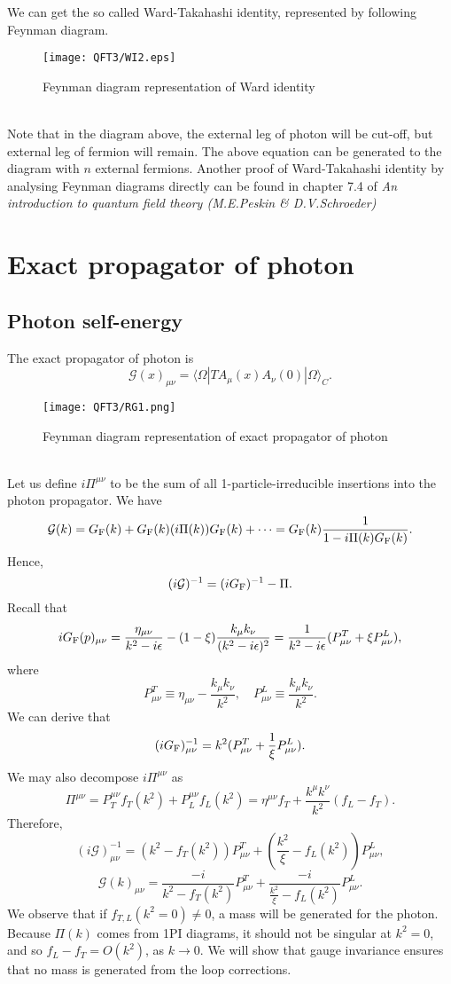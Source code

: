 We can get the so called Ward-Takahashi identity, represented by following Feynman diagram.
\begin{figure}[!h]
\centering
\texttt{[image: QFT3/WI2.eps]}
\caption{Feynman diagram representation of Ward identity}
\end{figure}
\\
Note that in the diagram above, the external leg of photon will be cut-off, but external leg of fermion will remain.
The above equation can be generated to the diagram with $n$ external fermions. 
Another proof of Ward-Takahashi identity by analysing Feynman diagrams directly can be found in chapter 7.4 of \emph{An introduction to quantum field theory (M.E.Peskin \& D.V.Schroeder)}

\section{Exact propagator of photon}
\subsection{Photon self-energy}
\noindent
The exact propagator of photon is
\[\mathcal{G}(x)_{\mu\nu} = \langle  \Omega | T A_{\mu}(x)A_{\nu}(0)| \Omega \rangle_C.\]
\begin{figure}[!htb]
\centering
\texttt{[image: QFT3/RG1.png]}
\caption{Feynman diagram representation of exact propagator of photon}
\end{figure}
\\
Let us define $i\Pi^{\mu\nu}$ to be the sum of all 1-particle-irreducible insertions into the photon propagator.
We have
\[\mathcal{G}(k) = G_{\rm F}(k) + G_{\rm F}(k)(i\Pi(k))G_{\rm F}(k) + \cdots = G_{\rm F}(k) \frac{1}{1-i\Pi(k)G_{\rm F}(k)}.\]
Hence,
\[(i\mathcal{G})^{-1} = (iG_{\rm F})^{-1} - \Pi.\]
Recall that
\[iG_{\rm F}(p)_{\mu\nu}  = \frac{\eta_{\mu\nu}}{k^2-i\epsilon} - (1-\xi)\frac{k_{\mu}k_{\nu}}{(k^2-i\epsilon)^2} = \frac{1}{k^2-i\epsilon}(P^T_{\mu\nu} + \xi P^L_{\mu\nu}),\]
where 
\[P^T_{\mu\nu} \equiv \eta_{\mu\nu} - \frac{k_{\mu}k_{\nu}}{k^2} , \quad  P^L_{\mu\nu} \equiv \frac{k_{\mu}k_{\nu}}{k^2}.\]
We can derive that
\[(iG_{\rm F})^{-1}_{\mu\nu} = k^2 (P^T_{\mu\nu} + \frac{1}{\xi} P^L_{\mu\nu}).\]
We may also decompose $i\Pi^{\mu\nu}$ as
\[\Pi^{\mu\nu} = P_T^{\mu\nu}f_T(k^2) +  P_L^{\mu\nu}f_L(k^2) = \eta^{\mu\nu}f_T + \frac{k^{\mu}k^{\nu}}{k^2}(f_L-f_T).\]
Therefore,
\[(i\mathcal{G})^{-1}_{\mu\nu} = (k^2-f_T(k^2))P^T_{\mu\nu} + (\frac{k^2}{\xi}-f_L(k^2)) P^L_{\mu\nu},\]
\[\mathcal{G}(k)_{\mu\nu} = \frac{-i}{k^2-f_T(k^2)}P^T_{\mu\nu} + \frac{-i}{\frac{k^2}{\xi}-f_L(k^2)} P^L_{\mu\nu}.\]
We observe that if $f_{T,L}(k^2 = 0) \neq 0$, a mass will be generated for the photon. Because $\Pi(k)$ comes from 1PI diagrams, it should not be singular at $k^2 =0 $, and so $f_L - f_T = O(k^2)$, as $k \to 0$. We will show that gauge invariance ensures that no mass is generated from the loop corrections.

